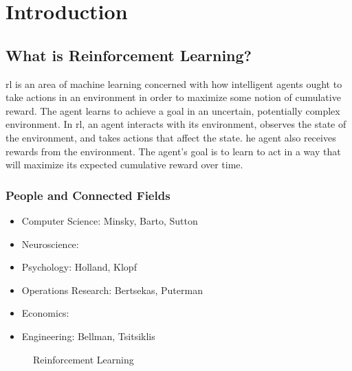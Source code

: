\chapter{Introduction}\label{chap:introduction}
\section{What is Reinforcement Learning?}
\gls{rl} is an area of machine learning concerned with how intelligent agents ought to \bblue take actions in an environment \eblue 
in order to maximize some notion of cumulative reward. 
The agent learns to achieve a goal in an uncertain, potentially complex environment.
In \gls{rl}, an agent interacts with its environment, observes the state of the environment, and takes actions that affect the state. 
he agent also receives rewards from the environment. 
The agent's goal is to learn to act in a way that will maximize its expected cumulative reward over time.

\subsection{People and Connected Fields}
\begin{itemize}
\item Computer Science: Minsky, Barto, Sutton
\item Neuroscience:
\item Psychology: Holland, Klopf
\item Operations Research: Bertsekas, Puterman
\item Economics:
\item Engineering: Bellman, Tsitsiklis    
\end{itemize}

\begin{figure}[h!]
    \centering
    \caption{Reinforcement Learning}
    \label{fig:rl}
\end{figure}


